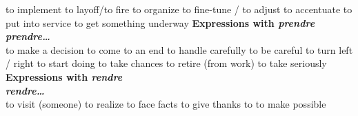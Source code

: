    {to implement}
   {to layoff/to fire}
   {to organize}
   {to fine-tune / to adjust}
   {to accentuate}
   {to put into service}
   {to get something underway}
     {\sffamily\bfseries Expressions with {\em prendre}}\\
                    {\bf {\em prendre\ldots}}\\
   {to make a decision}
   {to come to an end}
   {to handle carefully}
   {to be careful}
   {to turn left / right}
   {to start doing}
   {to take chances}
   {to retire (from work)}
   {to take seriously}
     {\sffamily\bfseries Expressions with {\em rendre}}\\
                         {\bf {\em rendre\ldots}}\\
        {to visit (someone)}
        {to realize}
        {to face facts}
         {to give thanks to}
        {to make possible}
